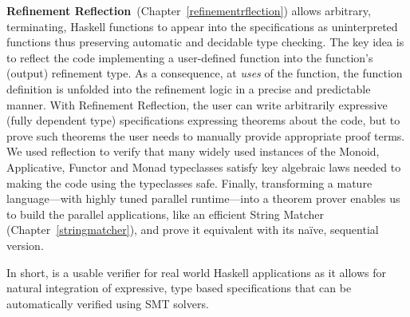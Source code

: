 \textbf{Refinement Reflection}~(Chapter~\ref{refinementrflection})
allows arbitrary, terminating, Haskell functions to 
appear into the specifications 
as uninterpreted functions thus preserving automatic and decidable 
type checking. 
%
The key idea is to reflect the ​code implementing a​
user-defined function into the function's (output)
refinement type.
%
As a consequence, at \emph{uses} of the function,
the function definition is unfolded into the refinement logic
in a precise and predictable manner.
%
With Refinement Reflection, 
the user can write arbitrarily expressive (fully dependent type)
specifications expressing theorems about the code, 
but to prove such theorems the user needs to manually provide 
appropriate proof terms. 
%
We used reflection to verify
that many widely used instances of the Monoid,
Applicative, Functor and Monad typeclasses 
satisfy key algebraic laws needed to
making the code using the typeclasses safe.
%
Finally, transforming a mature language---with
highly tuned parallel runtime---into a theorem
prover  enables us to build the parallel applications, 
like an efficient String Matcher (Chapter~\ref{stringmatcher}), 
and prove it equivalent with its na\"ive, sequential version.

In short, \toolname is a usable verifier for real world Haskell applications 
as it allows for natural integration of expressive, type based specifications 
that can be automatically verified using SMT solvers. 

